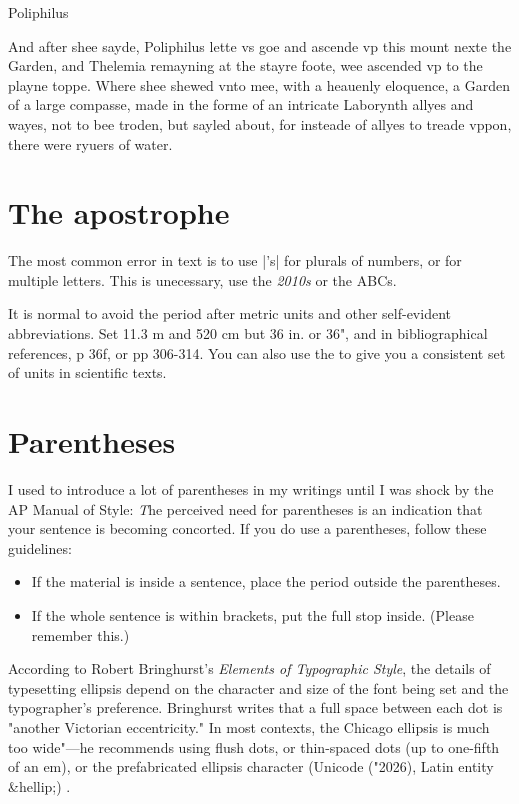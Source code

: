 \begin{scriptexample}[]{Poliphilus}

And after shee sayde, Poliphilus lette vs goe and ascende vp this mount nexte the Garden, and Thelemia remayning at the stayre foote, wee ascended vp to the playne toppe. Where shee shewed vnto mee, with a heauenly eloquence, a Garden of a large compasse, made in the forme of an intricate Laborynth allyes and wayes, not to bee troden, but sayled about, for insteade of allyes to treade vppon, there were ryuers of water.

\end{scriptexample}


\section{The apostrophe}

The most common error in text is to use |'s| for plurals of numbers, or for multiple letters. This is unecessary, use the \emph{2010s} or the ABCs.

It is normal to avoid the period after metric units and other self-evident abbreviations. Set 11.3 m and 520 cm but 36 in. or 36", and in bibliographical references, p 36f, or pp 306-314. You can also use the  to give you a consistent set of units in scientific texts.

\section{Parentheses}

I used to introduce a lot of parentheses in my writings until I was shock by the AP Manual of Style:
{\emph The perceived need for parentheses is an indication that your sentence is becoming concorted}. If you do use a parentheses, follow these guidelines:

\begin{itemize}
\item If the material is inside a sentence, place the period outside the parentheses.
\item If the whole sentence is within brackets, put the full stop inside. (Please remember this.)
\end{itemize}

According to Robert Bringhurst's  \textit{Elements of Typographic Style}, the details of typesetting ellipsis depend on the character and size of the font being set and the typographer's preference. Bringhurst writes that a full space between each dot is "another Victorian eccentricity." In most contexts, the Chicago ellipsis is much too wide"—he recommends using flush dots, or thin-spaced dots (up to one-fifth of an em), or the prefabricated ellipsis character (Unicode  ({\pan \char"2026}), Latin entity \&hellip;) \citep{Bringhurst2005}.

